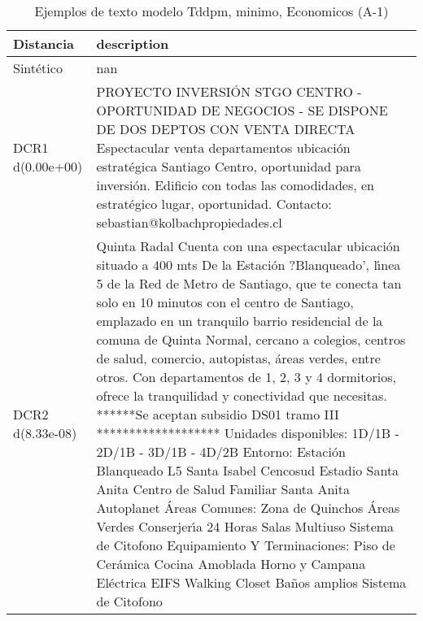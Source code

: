 \begin{table}[H]
\centering
\fontsize{10}{14}\selectfont
\caption{Ejemplos de texto modelo Tddpm, minimo, Economicos (A-1)}
\label{table-example-economicos-a-1-tddpm_mlp-min-text}
\begin{tabular}{|l|m{35em}|}
\hline
\rowcolor[gray]{0.8}
Distancia & description \\
\hline Sintético & nan \\
\hline DCR1 d(0.00e+00) & PROYECTO INVERSI\'ON STGO CENTRO - OPORTUNIDAD DE NEGOCIOS - SE DISPONE DE DOS DEPTOS CON VENTA DIRECTA Espectacular venta departamentos ubicaci\'on estrat\'egica Santiago Centro, oportunidad para inversi\'on. Edificio con todas las comodidades, en estrat\'egico lugar, oportunidad. Contacto: sebastian@kolbachpropiedades.cl \\
\hline DCR2 d(8.33e-08) & Quinta Radal Cuenta con una espectacular ubicaci\'on situado a 400 mts De la Estaci\'on ?Blanqueado', l{\'\i}nea 5 de la Red de Metro de Santiago, que te conecta tan solo en 10 minutos con el centro de Santiago, emplazado en un tranquilo barrio residencial de la comuna de Quinta Normal, cercano a colegios, centros de salud, comercio, autopistas, \'areas verdes, entre otros. Con departamentos de 1, 2, 3 y 4 dormitorios, ofrece la tranquilidad y conectividad que necesitas.   ******Se aceptan subsidio DS01 tramo III *******************  Unidades disponibles: 1D/1B - 2D/1B - 3D/1B - 4D/2B  Entorno: Estaci\'on Blanqueado L5 Santa Isabel Cencosud Estadio Santa Anita Centro de Salud Familiar Santa Anita Autoplanet   \'Areas Comunes: Zona de Quinchos \'Areas Verdes Conserjer{\'\i}a 24 Horas Salas Multiuso Sistema de Citofono   Equipamiento Y Terminaciones: Piso de Cer\'amica Cocina Amoblada Horno y Campana El\'ectrica EIFS Walking Closet Ba\~nos amplios Sistema de Citofono \\
\hline
\end{tabular}
\end{table}
